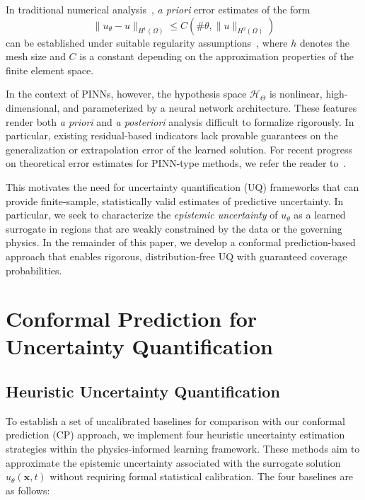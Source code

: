 \documentclass[preprint,12pt]{elsarticle}
\begin{document}
In traditional numerical analysis~\cite{brenner2008mathematical}, \textit{a priori} error estimates of the form
\[
\|u_\theta - u\|_{H^1(\Omega)} \leq C(\#\theta, \|u\|_{H^2(\Omega)})
\]
can be established under suitable regularity assumptions~\cite{brenner2008mathematical, bramble1970estimation}, where $h$ denotes the mesh size and $C$ is a constant depending on the approximation properties of the finite element space. 

In the context of PINNs, however, the hypothesis space $\mathcal{H}_\Theta$ is nonlinear, high-dimensional, and parameterized by a neural network architecture. These features render both \textit{a priori} and \textit{a posteriori} analysis difficult to formalize rigorously. In particular, existing residual-based indicators lack provable guarantees on the generalization or extrapolation error of the learned solution. For recent progress on theoretical error estimates for PINN-type methods, we refer the reader to~\cite{mishra2023estimates, mishra2022estimates}.


This motivates the need for uncertainty quantification (UQ) frameworks that can provide finite-sample, statistically valid estimates of predictive uncertainty. In particular, we seek to characterize the \emph{epistemic uncertainty} of $u_\theta$ as a learned surrogate in regions that are weakly constrained by the data or the governing physics. In the remainder of this paper, we develop a conformal prediction-based approach that enables rigorous, distribution-free UQ with guaranteed coverage probabilities.


\section{Conformal Prediction for Uncertainty Quantification}
\label{sec:cp}

\subsection{Heuristic Uncertainty Quantification}
\label{sec:sub:original_uq}

To establish a set of uncalibrated baselines for comparison with our conformal prediction (CP) approach, we implement four heuristic uncertainty estimation strategies within the physics-informed learning framework. These methods aim to approximate the epistemic uncertainty associated with the surrogate solution $u_\theta(\mathbf{x},t)$ without requiring formal statistical calibration. The four baselines are as follows:
\end{document}
